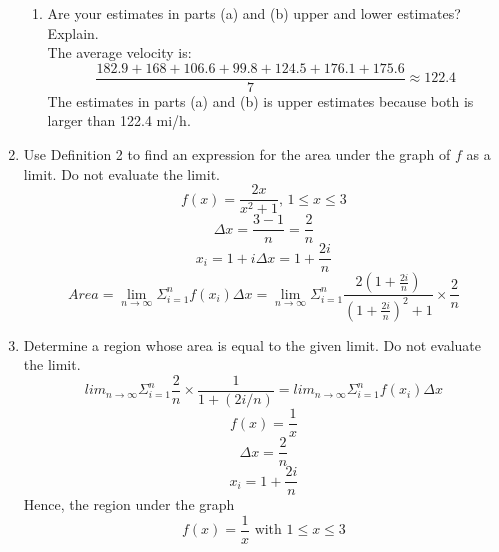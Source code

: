 \documentclass[12pt]{article}
\begin{document}
\begin{enumerate}
\begin{enumerate}
            \item Are your estimates in parts (a) and (b) upper and lower estimates? Explain.\\
                The average velocity is:
                \[\frac{182.9 + 168 + 106.6 + 99.8 + 124.5 + 176.1 + 175.6}{7} \approx 122.4 \]
                The estimates in parts (a) and (b) is upper estimates because both is larger than 122.4 mi/h. 
        \end{enumerate}
        \setcounter{enumi}{15}
        \item Use Definition 2 to find an expression for the area under the graph of $f$ as a limit. Do not evaluate the limit.
        \[f(x) = \frac{2x}{x^2+1} \text{, } 1 \leq x \leq 3\]
        \[\Delta x = \frac{3-1}{n} = \frac{2}{n}\]
        \[x_i = 1 + i\Delta x = 1 + \frac{2i}{n}\]
        \[Area = \lim_{n \to \infty} \Sigma^{n}_{i = 1}f(x_i)\Delta x = \lim_{n \to \infty} \Sigma^{n}_{i = 1}\frac{2(1 + \frac{2i}{n})}{(1 + \frac{2i}{n})^2+1}\times\frac{2}{n}\]
        \setcounter{enumi}{20}
        \item Determine a region whose area is equal to the given limit. Do not evaluate the limit.
        \[lim_{n\to\infty} \Sigma^{n}_{i=1} \frac{2}{n}\times \frac{1}{1+(2i/n)} = lim_{n\to\infty} \Sigma^{n}_{i=1} f(x_i) \Delta x\]
        \[f(x) = \frac{1}{x}\]
        \[\Delta x = \frac{2}{n}\]
        \[x_i = 1 + \frac{2i}{n}\]
        Hence, the region under the graph 
        \[f(x) = \frac{1}{x} \text{ with } 1 \leq x \leq 3\]
\end{enumerate}
\end{document}
